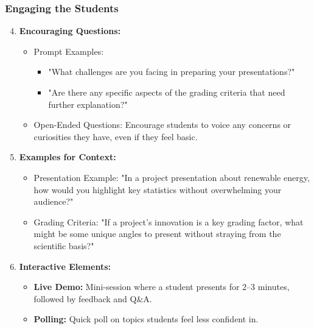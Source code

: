 \documentclass[aspectratio=169]{beamer}
\begin{document}
\begin{frame}[fragile]
    \frametitle{Engaging the Students}
    \begin{enumerate}
        \setcounter{enumi}{3}
        \item \textbf{Encouraging Questions:}
            \begin{itemize}
                \item Prompt Examples:
                    \begin{itemize}
                        \item "What challenges are you facing in preparing your presentations?"
                        \item "Are there any specific aspects of the grading criteria that need further explanation?"
                    \end{itemize}
                \item Open-Ended Questions: Encourage students to voice any concerns or curiosities they have, even if they feel basic.
            \end{itemize}
        
        \item \textbf{Examples for Context:}
            \begin{itemize}
                \item Presentation Example: "In a project presentation about renewable energy, how would you highlight key statistics without overwhelming your audience?"
                \item Grading Criteria: "If a project's innovation is a key grading factor, what might be some unique angles to present without straying from the scientific basis?"
            \end{itemize}
        
        \item \textbf{Interactive Elements:}
            \begin{itemize}
                \item \textbf{Live Demo:} Mini-session where a student presents for 2–3 minutes, followed by feedback and Q\&A.
                \item \textbf{Polling:} Quick poll on topics students feel less confident in.
            \end{itemize}
    \end{enumerate}
\end{frame}
\end{document}
